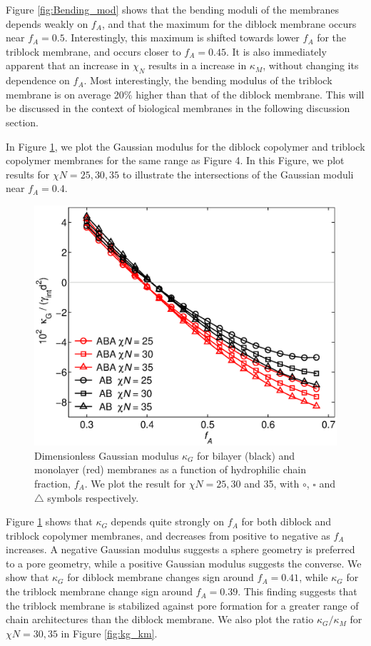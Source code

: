\documentclass[twocolumn,aps,floatfix,nobibnotes]{revtex4-1}
\begin{document}
Figure \ref{fig:Bending_mod} shows that the bending moduli of the membranes depends weakly on $f_A$, and that the maximum for the diblock membrane occurs near $f_A = 0.5$. Interestingly, this maximum is shifted towards lower $f_A$ for the triblock membrane, and occurs closer to $f_A = 0.45$. It is also immediately apparent that an increase in $\chi_N$ results in a increase in $\kappa_M$, without changing its dependence on $f_A$. Most interestingly, the bending modulus of the triblock membrane is on average 20$\%$ higher than that of the diblock membrane. This will be discussed in the context of biological membranes in the following discussion section.

In Figure \ref{fig:Gaussian_mod}, we plot the Gaussian modulus for the diblock copolymer and triblock copolymer membranes for the same range as Figure 4. In this Figure, we plot results for $\chi N = 25,30,35$ to illustrate the intersections of the Gaussian moduli near $f_A = 0.4$.


\begin{figure}[htp]
\centering
\includegraphics[width=1.0\columnwidth]{Gaussian_mod.eps}
\caption{Dimensionless Gaussian modulus $\kappa_G$ for bilayer (black) and monolayer (red) membranes as a function of hydrophilic chain fraction, $f_A$. We plot the result for $\chi N = 25,30$ and 35, with $\circ$, $\square$ and $\triangle$ symbols respectively.}
\label{fig:Gaussian_mod}
\centering
\end{figure}

Figure \ref{fig:Gaussian_mod} shows that $\kappa_G$ depends quite strongly on $f_A$ for both diblock and triblock copolymer membranes, and decreases from positive to negative as $f_A$ increases. A negative Gaussian modulus suggests a sphere geometry is preferred to a pore geometry, while a positive Gaussian modulus suggests the converse. We show that $\kappa_G$ for diblock membrane changes sign around $f_A = 0.41$, while $\kappa_G$ for the triblock membrane change sign around $f_A = 0.39$. This finding suggests that the triblock membrane is stabilized against pore formation for a greater range of chain architectures than the diblock membrane. We also plot the ratio $\kappa_G/\kappa_M$ for $\chi N = 30,35$ in Figure \ref{fig:kg_km}. 
\end{document}
